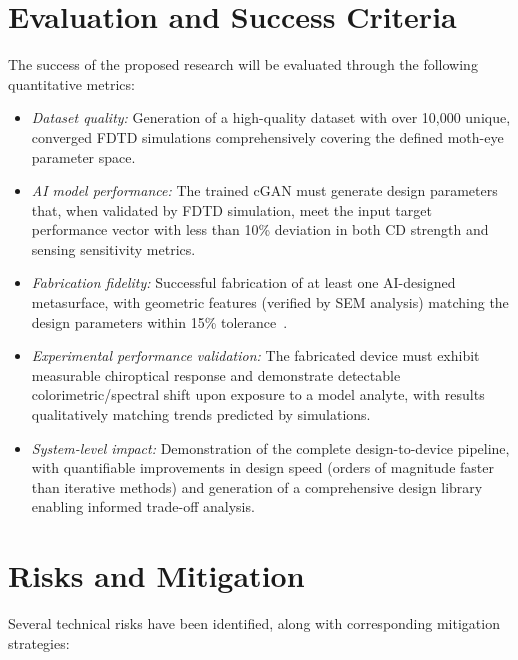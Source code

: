 \documentclass[12pt,a4paper]{article}
\begin{document}
\section{Evaluation and Success Criteria}
The success of the proposed research will be evaluated through the following quantitative metrics:

\begin{itemize}
  \item \textit{Dataset quality:} Generation of a high-quality dataset with over 10,000 unique, converged FDTD simulations comprehensively covering the defined moth-eye parameter space.
  \item \textit{AI model performance:} The trained cGAN must generate design parameters that, when validated by FDTD simulation, meet the input target performance vector with less than 10\% deviation in both CD strength and sensing sensitivity metrics.
  \item \textit{Fabrication fidelity:} Successful fabrication of at least one AI-designed metasurface, with geometric features (verified by SEM analysis) matching the design parameters within 15\% tolerance~\cite{cv_zheng}.
  \item \textit{Experimental performance validation:} The fabricated device must exhibit measurable chiroptical response and demonstrate detectable colorimetric/spectral shift upon exposure to a model analyte, with results qualitatively matching trends predicted by simulations.
  \item \textit{System-level impact:} Demonstration of the complete design-to-device pipeline, with quantifiable improvements in design speed (orders of magnitude faster than iterative methods) and generation of a comprehensive design library enabling informed trade-off analysis.
\end{itemize}

\section{Risks and Mitigation}
Several technical risks have been identified, along with corresponding mitigation strategies:
\end{document}
